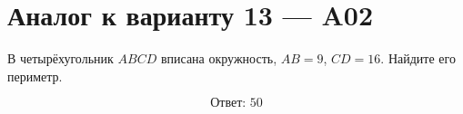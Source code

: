 


\section*{Аналог к варианту 13 — A02}
В четырёхугольник \(ABCD\) вписана окружность, \(AB=9\), \(CD=16\). Найдите его периметр.
\begin{center}\figTangentialPerimeter\end{center}
\[\boxed{\text{Ответ: }50}\]

